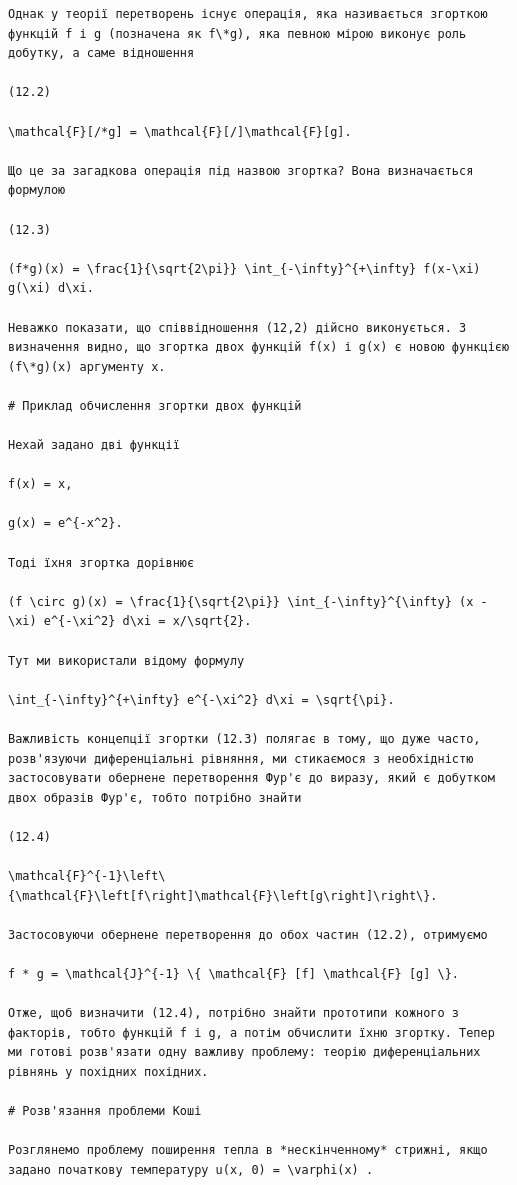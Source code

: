 \documentclass[
  ukrainian,
]{article}
\begin{document}
\begin{verbatim}
Однак у теорії перетворень існує операція, яка називається згорткою функцій f і g (позначена як f\*g), яка певною мірою виконує роль добутку, а саме відношення

(12.2)

\mathcal{F}[/*g] = \mathcal{F}[/]\mathcal{F}[g].

Що це за загадкова операція під назвою згортка? Вона визначається формулою

(12.3)

(f*g)(x) = \frac{1}{\sqrt{2\pi}} \int_{-\infty}^{+\infty} f(x-\xi) g(\xi) d\xi.

Неважко показати, що співвідношення (12,2) дійсно виконується. З визначення видно, що згортка двох функцій f(x) і g(x) є новою функцією (f\*g)(x) аргументу x.

# Приклад обчислення згортки двох функцій

Нехай задано дві функції

f(x) = x,

g(x) = e^{-x^2}.

Тоді їхня згортка дорівнює

(f \circ g)(x) = \frac{1}{\sqrt{2\pi}} \int_{-\infty}^{\infty} (x - \xi) e^{-\xi^2} d\xi = x/\sqrt{2}.

Тут ми використали відому формулу

\int_{-\infty}^{+\infty} e^{-\xi^2} d\xi = \sqrt{\pi}.

Важливість концепції згортки (12.3) полягає в тому, що дуже часто, розв'язуючи диференціальні рівняння, ми стикаємося з необхідністю застосовувати обернене перетворення Фур'є до виразу, який є добутком двох образів Фур'є, тобто потрібно знайти

(12.4)

\mathcal{F}^{-1}\left\{\mathcal{F}\left[f\right]\mathcal{F}\left[g\right]\right\}.

Застосовуючи обернене перетворення до обох частин (12.2), отримуємо

f * g = \mathcal{J}^{-1} \{ \mathcal{F} [f] \mathcal{F} [g] \}.

Отже, щоб визначити (12.4), потрібно знайти прототипи кожного з факторів, тобто функцій f і g, а потім обчислити їхню згортку. Тепер ми готові розв'язати одну важливу проблему: теорію диференціальних рівнянь у похідних похідних.

# Розв'язання проблеми Коші

Розглянемо проблему поширення тепла в *нескінченному* стрижні, якщо задано початкову температуру u(x, 0) = \varphi(x) .


\end{verbatim}
\end{document}
